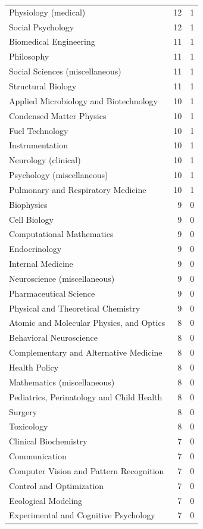 \documentclass[12pt,brazil]{article}\usepackage[]{graphicx}\usepackage[]{xcolor}
\begin{document}
\begin{longtable}{lrr}
Physiology (medical) & 12 & 1 \\
Social Psychology & 12 & 1 \\
Biomedical Engineering & 11 & 1 \\
Philosophy & 11 & 1 \\
Social Sciences (miscellaneous) & 11 & 1 \\
Structural Biology & 11 & 1 \\
Applied Microbiology and Biotechnology & 10 & 1 \\
Condensed Matter Physics & 10 & 1 \\
Fuel Technology & 10 & 1 \\
Instrumentation & 10 & 1 \\
Neurology (clinical) & 10 & 1 \\
Psychology (miscellaneous) & 10 & 1 \\
Pulmonary and Respiratory Medicine & 10 & 1 \\
Biophysics & 9 & 0 \\
Cell Biology & 9 & 0 \\
Computational Mathematics & 9 & 0 \\
Endocrinology & 9 & 0 \\
Internal Medicine & 9 & 0 \\
Neuroscience (miscellaneous) & 9 & 0 \\
Pharmaceutical Science & 9 & 0 \\
Physical and Theoretical Chemistry & 9 & 0 \\
Atomic and Molecular Physics, and Optics & 8 & 0 \\
Behavioral Neuroscience & 8 & 0 \\
Complementary and Alternative Medicine & 8 & 0 \\
Health Policy & 8 & 0 \\
Mathematics (miscellaneous) & 8 & 0 \\
Pediatrics, Perinatology and Child Health & 8 & 0 \\
Surgery & 8 & 0 \\
Toxicology & 8 & 0 \\
Clinical Biochemistry & 7 & 0 \\
Communication & 7 & 0 \\
Computer Vision and Pattern Recognition & 7 & 0 \\
Control and Optimization & 7 & 0 \\
Ecological Modeling & 7 & 0 \\
Experimental and Cognitive Psychology & 7 & 0 \\

\end{longtable}
\end{document}
